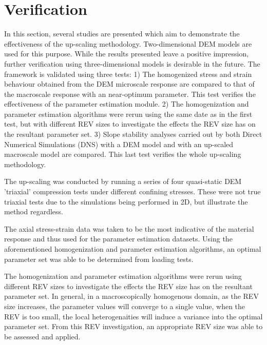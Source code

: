 \section{Verification}

In this section, several studies are presented which aim to demonstrate the effectiveness of the up-scaling methodology. Two-dimensional DEM models are used for this purpose. While the results presented leave a positive impression, further verification using three-dimensional models is desirable in the future. The framework is validated using three tests: 1) The homogenized stress and strain behaviour obtained from the DEM microscale response are compared to that of the macroscale response with an near-optimum parameter. This test verifies the effectiveness of the parameter estimation module. 2) The homogenization and parameter estimation algorithms were rerun using the same date as in the first test, but with different REV sizes to investigate the effects the REV size has on the resultant parameter set. 3) Slope stability analyses  carried out by both Direct Numerical Simulations (DNS) with a DEM model and with an up-scaled macroscale model are compared. This last test verifies the whole up-scaling methodology.

 The up-scaling was conducted by running a series of four quasi-static DEM 'triaxial' compression tests under different confining stresses. These were not true triaxial tests due to the simulations being performed in 2D, but illustrate the method regardless.

The axial stress-strain data was taken to be the most indicative of the material response and thus used for the parameter estimation datasets. Using the aforementioned homogenization and parameter estimation algorithms, an optimal parameter set was able to be determined from loading tests.

The homogenization and parameter estimation algorithms were rerun using different REV sizes to investigate the effects the REV size has on the resultant parameter set. In general, in a macroscopically homogenous domain, as the REV size increases, the parameter values will converge to a single value, when the REV is too small, the local heterogenaities will induce a variance into the optimal parameter set. From this REV investigation, an appropriate REV size was able to be assessed and applied. 

